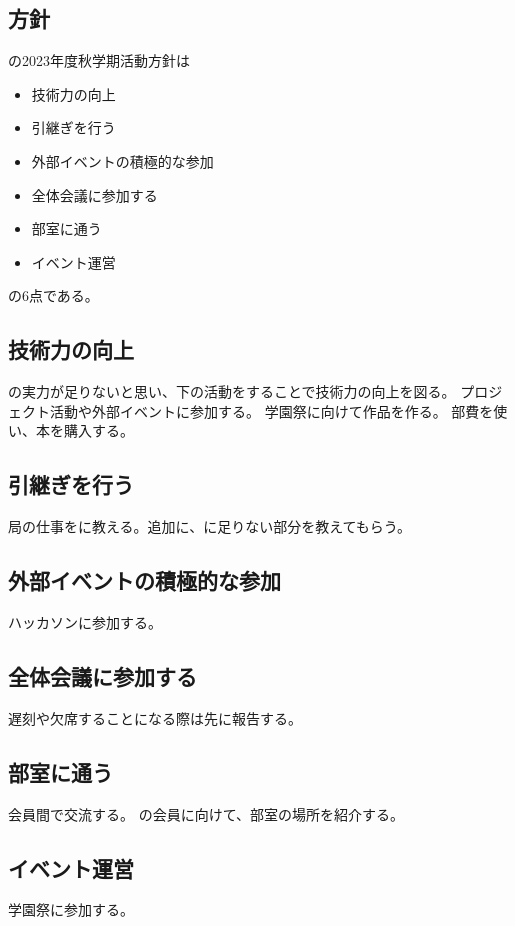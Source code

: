 \subsection*{\newGradeIfKouki{}\secondGrade{}方針}


\secondGrade{}の2023年度秋学期活動方針は
\begin{itemize}
    \item 技術力の向上
    \item 引継ぎを行う
    \item 外部イベントの積極的な参加
    \item 全体会議に参加する
    \item 部室に通う
    \item イベント運営
\end{itemize}
の6点である。

\subsection{技術力の向上}
\secondGrade{}の実力が足りないと思い、下の活動をすることで技術力の向上を図る。
プロジェクト活動や外部イベントに参加する。
学園祭に向けて作品を作る。
部費を使い、本を購入する。

\subsection{引継ぎを行う}
局の仕事を\firstGrade{}に教える。追加に、\thirdGrade{}に足りない部分を教えてもらう。

\subsection{外部イベントの積極的な参加}
ハッカソンに参加する。

\subsection{全体会議に参加する}
遅刻や欠席することになる際は先に報告する。

\subsection{部室に通う}
会員間で交流する。
\firstGrade{}の会員に向けて、部室の場所を紹介する。

\subsection{イベント運営}
学園祭に参加する。

